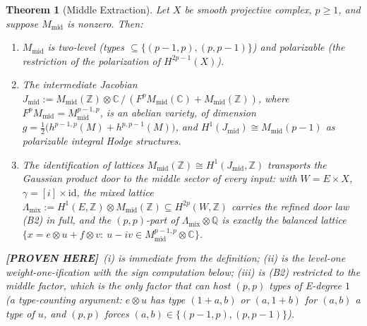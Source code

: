 \documentclass[11pt]{article}
\newtheorem{theorem}{Theorem}
\newcommand{\PROVEN}{\textbf{[PROVEN HERE]}}
\newcommand{\Z}{\mathbb{Z}}
\newcommand{\Q}{\mathbb{Q}}
\newcommand{\C}{\mathbb{C}}
\begin{document}
\begin{theorem}[Middle Extraction]\label{thm:middle}
Let $X$ be smooth projective complex, $p\ge1$, and suppose
$M_{\mathrm{mid}}$ is nonzero. Then:
\begin{enumerate}[label=(\roman*)]
\item $M_{\mathrm{mid}}$ is two-level (types $\subseteq\{(p-1,p),(p,p-1)\}$)
and polarizable (the restriction of the polarization of $H^{2p-1}(X)$).
\item The intermediate Jacobian
$J_{\mathrm{mid}}:=M_{\mathrm{mid}}(\Z)\otimes\C\,/\,(F^{p}M_{\mathrm{mid}}(\C)+
M_{\mathrm{mid}}(\Z))$, where $F^pM_{\mathrm{mid}}=M_{\mathrm{mid}}^{p-1,p}$,
is an \emph{abelian variety}, of dimension
$g=\tfrac12\big(h^{p-1,p}(M)+h^{p,p-1}(M)\big)$, and
$H^1(J_{\mathrm{mid}})\cong M_{\mathrm{mid}}(p-1)$ as polarizable integral
Hodge structures.
\item The identification of lattices
$M_{\mathrm{mid}}(\Z)\cong H^1(J_{\mathrm{mid}},\Z)$ transports the Gaussian
product door to the middle sector of \emph{every} input: with $W=E\times X$,
$\gamma=[i]\times\mathrm{id}$, the mixed lattice
$\Lambda_{\mathrm{mix}}:=H^1(E,\Z)\otimes M_{\mathrm{mid}}(\Z)\subseteq H^{2p}(W,\Z)$
carries the refined door law (B2) in full, and the $(p,p)$-part of
$\Lambda_{\mathrm{mix}}\otimes\Q$ is exactly the balanced lattice
$\{x=e\otimes u+f\otimes v:\ u-iv\in M_{\mathrm{mid}}^{p-1,p}\otimes\C\}$.
\end{enumerate}
\PROVEN{}\ (i) is immediate from the definition; (ii) is the level-one
weight-one-ification with the sign computation below; (iii) is (B2) restricted
to the middle factor, which is the only factor that can host $(p,p)$ types of
E-degree $1$ (a type-counting argument: $e\otimes u$ has type
$(1+a,b)$ or $(a,1+b)$ for $(a,b)$ a type of $u$, and $(p,p)$ forces
$(a,b)\in\{(p-1,p),(p,p-1)\}$).
\end{theorem}
\end{document}
